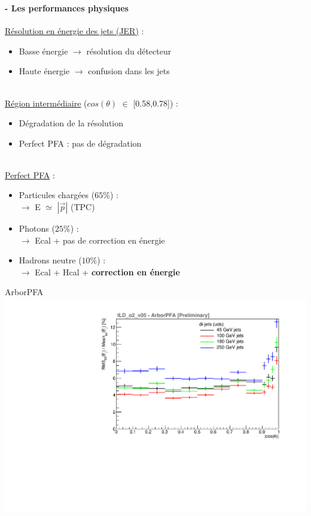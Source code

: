 \documentclass[8pt]{beamer}
\begin{document}
  \begin{frame}
  \frametitle{\secname}
  \framesubtitle{\subsecname - Les performances physiques}
    \begin{minipage}{0.49\linewidth}
      \underline{Résolution en énergie des jets (JER)} :
      \begin{itemize}
        \item Basse énergie $\rightarrow$ résolution du détecteur
        \item Haute énergie $\rightarrow$ confusion dans les jets
      \end{itemize}
      ~ \\
      \underline{Région intermédiaire} ($cos(\theta)$ $\in$ [0.58,0.78]) :
      \begin{itemize}
        \item Dégradation de la résolution
        \item Perfect PFA : pas de dégradation
      \end{itemize}
      ~ \\
      \underline{Perfect PFA} :
      \begin{itemize}
        \item Particules chargées ($65\%$) : \\ $\rightarrow$ E $\simeq$ $|\vec{p}|$ (TPC)
        \item Photons ($25\%$) : \\ $\rightarrow$ Ecal + pas de correction en énergie
        \item Hadrons neutre ($10\%$) : \\ $\rightarrow$ Ecal + Hcal + \textbf{correction en énergie}
      \end{itemize}
    \end{minipage}
    \begin{minipage}{0.49\linewidth}
      \begin{center}
        ArborPFA \\
        \includegraphics[width=\linewidth]{ILDArborPFA_Resolution_NoNeutralHadron.pdf} \\

\end{center}
\end{minipage}
\end{frame}
\end{document}
